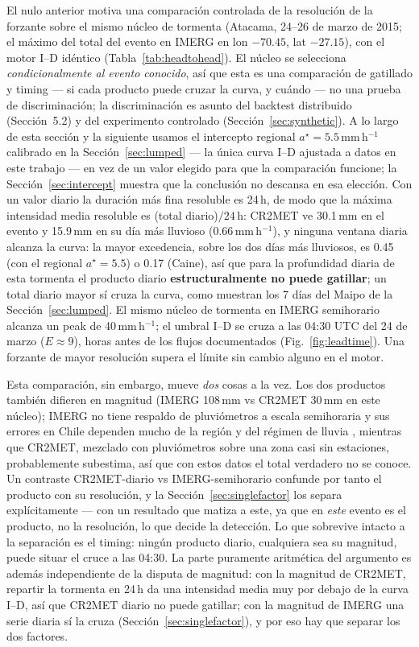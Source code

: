 \documentclass[authoryear,preprint,review,12pt]{elsarticle}
\begin{document}
El nulo anterior motiva una comparación controlada de la resolución de la forzante
sobre el mismo núcleo de tormenta (Atacama, 24--26 de marzo de 2015; el máximo del
total del evento en IMERG en lon $-70.45$, lat $-27.15$), con el motor I--D
idéntico (Tabla~\ref{tab:headtohead}). El núcleo se selecciona
\emph{condicionalmente al evento conocido}, así que esta es una comparación de
gatillado y timing --- si cada producto puede cruzar la curva, y cuándo --- no una
prueba de discriminación; la discriminación es asunto del backtest distribuido
(Sección~5.2) y del experimento controlado (Sección~\ref{sec:synthetic}). A lo
largo de esta sección y la siguiente usamos el intercepto regional
$a^\star=5.5$\,mm\,h$^{-1}$ calibrado en la Sección~\ref{sec:lumped} --- la única
curva I--D ajustada a datos en este trabajo --- en vez de un valor elegido para que
la comparación funcione; la Sección~\ref{sec:intercept} muestra que la conclusión
no descansa en esa elección. Con un valor diario la duración más fina resoluble es
24\,h, de modo que la máxima intensidad media resoluble es (total diario)$/24$\,h:
CR2MET ve 30.1\,mm en el evento y 15.9\,mm en su día más lluvioso
(0.66\,mm\,h$^{-1}$), y ninguna ventana diaria alcanza la curva: la mayor excedencia,
sobre los dos días más lluviosos, es 0.45 (con el regional $a^\star=5.5$) o 0.17
(Caine), así que para la profundidad diaria de esta tormenta el producto diario
\textbf{estructuralmente no puede gatillar}; un total diario mayor sí cruza la
curva, como muestran los 7 días del Maipo de la Sección~\ref{sec:lumped}. El mismo
núcleo de tormenta en IMERG semihorario alcanza un peak de 40\,mm\,h$^{-1}$; el
umbral I--D se cruza a las 04:30 UTC del 24 de marzo ($E\approx9$), horas antes de
los flujos documentados (Fig.~\ref{fig:leadtime}). Una forzante de mayor resolución
supera el límite sin cambio alguno en el motor.

Esta comparación, sin embargo, mueve \emph{dos} cosas a la vez. Los dos productos
también difieren en magnitud (IMERG 108\,mm vs CR2MET 30\,mm en este núcleo); IMERG no tiene
respaldo de pluviómetros a escala semihoraria y sus errores en Chile dependen mucho
de la región y del régimen de lluvia \citep{baezvillanueva2018,rojas2021}, mientras
que CR2MET, mezclado con pluviómetros sobre una zona casi sin estaciones,
probablemente subestima, así que con estos datos el total verdadero no se conoce. Un contraste
CR2MET-diario vs IMERG-semihorario confunde por tanto el producto con su
resolución, y la Sección~\ref{sec:singlefactor} los separa explícitamente --- con
un resultado que matiza a este, ya que en \emph{este} evento es el producto, no la
resolución, lo que decide la detección. Lo que sobrevive intacto a la separación es
el timing: ningún producto diario, cualquiera sea su magnitud, puede situar el
cruce a las 04:30. La parte puramente aritmética del argumento es además
independiente de la disputa de magnitud: con la magnitud de CR2MET, repartir la tormenta en 24\,h da una intensidad media
muy por debajo de la curva I--D, así que CR2MET diario no puede gatillar; con la
magnitud de IMERG una serie diaria sí la cruza (Sección~\ref{sec:singlefactor}), y
por eso hay que separar los dos factores.
\end{document}
